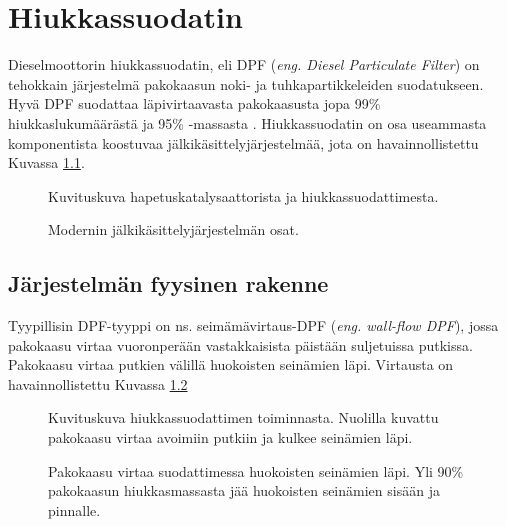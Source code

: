 \chapter{Hiukkassuodatin}%
\label{ch:dpf}



Dieselmoottorin hiukkassuodatin, eli DPF (\emph{eng. Diesel Particulate Filter}) on tehokkain järjestelmä pakokaasun noki- ja tuhkapartikkeleiden suodatukseen. 
Hyvä DPF suodattaa läpivirtaavasta pakokaasusta jopa 99\% hiukkaslukumäärästä ja 95\% -massasta \cite{Yan_state_of_the_art}. Hiukkassuodatin on osa useammasta komponentista koostuvaa jälkikäsittelyjärjestelmää, jota on havainnollistettu Kuvassa \ref{fig:EAT_full}. %

\begin{figure}[H]
    \centering
                {Kuvituskuva hapetuskatalysaattorista ja hiukkassuodattimesta.}
    \caption{Modernin jälkikäsittelyjärjestelmän osat.}
    \label{fig:EAT_full}
\end{figure}



\section{Järjestelmän fyysinen rakenne}

Tyypillisin DPF-tyyppi on ns. seimämävirtaus-DPF (\emph{eng. wall-flow DPF}), jossa pakokaasu virtaa vuoronperään vastakkaisista päistään suljetuissa putkissa. Pakokaasu virtaa putkien välillä huokoisten seinämien läpi. Virtausta on havainnollistettu Kuvassa \ref{fig:wall-flow-dpf}  


\begin{figure}[H]
    \centering 
               {Kuvituskuva hiukkassuodattimen toiminnasta. Nuolilla kuvattu pakokaasu virtaa avoimiin putkiin ja kulkee seinämien läpi.}
    \caption{Pakokaasu virtaa suodattimessa huokoisten seinämien läpi. Yli 90\% pakokaasun hiukkasmassasta jää huokoisten seinämien sisään ja pinnalle.}
    \label{fig:wall-flow-dpf}
\end{figure}



